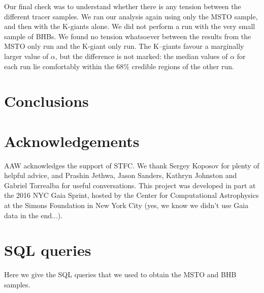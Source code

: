 \documentclass[useAMS,twocolumn,usenatbib]{mn2e}
\begin{document}
Our final check was to understand whether there is any tension between the different tracer samples. We ran our analysis again 
using only the MSTO sample, and then with the K-giants alone. We did not perform a run with the very small sample of BHBs. We 
found no tension whatsoever between the results from the MSTO only run and the K-giant only run. The 
K--giants favour a marginally larger value of $\alpha$, but the difference is not marked: the median values of $\alpha$ for each 
run lie comfortably within the 68\% credible regions of the other run.   

\section{Conclusions}



\section{Acknowledgements}

AAW acknowledges the support of STFC. We thank Sergey Koposov for plenty of helpful advice, and 
Prashin Jethwa, Jason Sanders, Kathryn Johnston and Gabriel Torrealba for useful conversations. 
This project was developed in part at the 2016 NYC Gaia Sprint, 
hosted by the Center for Computational Astrophysics at the Simons Foundation in New York City (yes, 
we know we didn't use Gaia data in the end...). 




\appendix

\section{SQL queries}
\label{sec:sql}

Here we give the {\sc SQL} queries that we used to obtain the MSTO and BHB samples.
\end{document}
